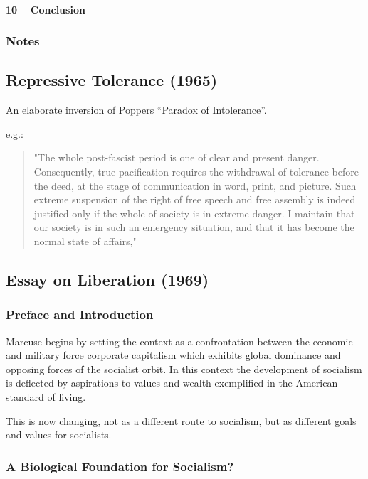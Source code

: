 \documentclass[10pt,titlepage]{book}
\begin{document}
\paragraph{10 – Conclusion}
\subsubsection{Notes}


\subsection{Repressive Tolerance (1965)\cite{marcuse-repressive}}

An elaborate inversion of Poppers ``Paradox of Intolerance''.

e.g.:

\begin{quotation}
"The whole post-fascist period is one of clear and present danger. Consequently, true pacification requires the withdrawal of tolerance before the deed, at the stage of communication in word, print, and picture. Such extreme suspension of the right of free speech and free assembly is indeed justified only if the whole of society is in extreme danger. I maintain that our society is in such an emergency situation, and that it has become the normal state of affairs,"
\end{quotation}

  
\subsection{Essay on Liberation (1969)\cite{marcuse-liberation}}

\subsubsection{Preface and Introduction}

Marcuse begins by setting the context as a confrontation between the economic and military force corporate capitalism which exhibits global dominance and opposing forces of the socialist orbit.
In this context the development of socialism is deflected by aspirations to values and wealth exemplified in the American standard of living.

This is now changing, not as a different route to socialism, but as different goals and values for socialists.


\subsubsection{A Biological Foundation for Socialism?}
\end{document}
